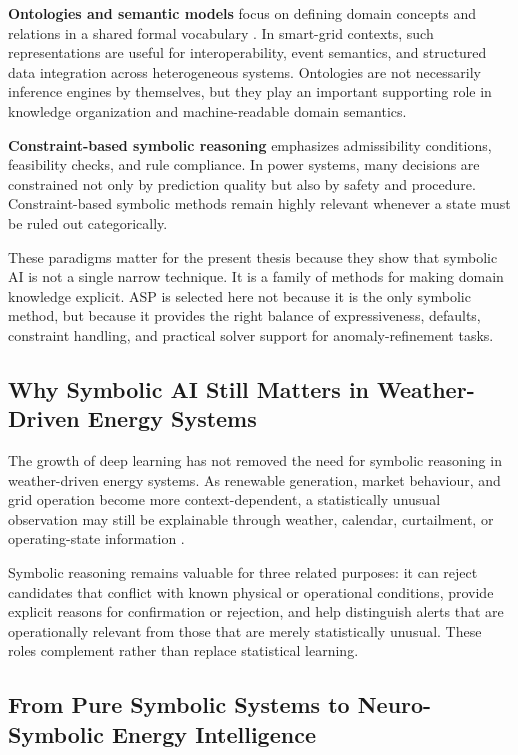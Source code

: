 \textbf{Ontologies and semantic models} focus on defining domain concepts and relations in a shared formal vocabulary \cite{gruber1993ontology,sowa2000knowledge}. In smart-grid contexts, such representations are useful for interoperability, event semantics, and structured data integration across heterogeneous systems. Ontologies are not necessarily inference engines by themselves, but they play an important supporting role in knowledge organization and machine-readable domain semantics.

\textbf{Constraint-based symbolic reasoning} emphasizes admissibility conditions, feasibility checks, and rule compliance. In power systems, many decisions are constrained not only by prediction quality but also by safety and procedure. Constraint-based symbolic methods remain highly relevant whenever a state must be ruled out categorically.

These paradigms matter for the present thesis because they show that symbolic AI is not a single narrow technique. It is a family of methods for making domain knowledge explicit. ASP is selected here not because it is the only symbolic method, but because it provides the right balance of expressiveness, defaults, constraint handling, and practical solver support for anomaly-refinement tasks.

\subsection{Why Symbolic AI Still Matters in Weather-Driven Energy Systems}

The growth of deep learning has not removed the need for symbolic reasoning in
weather-driven energy systems. As renewable generation, market behaviour, and
grid operation become more context-dependent, a statistically unusual observation
may still be explainable through weather, calendar, curtailment, or operating-state
information \cite{amin2005toward,fang2012smartgrid,momoh2012smart}.

Symbolic reasoning remains valuable for three related purposes: it can reject
candidates that conflict with known physical or operational conditions, provide
explicit reasons for confirmation or rejection, and help distinguish alerts that
are operationally relevant from those that are merely statistically unusual. These
roles complement rather than replace statistical learning.

\subsection{From Pure Symbolic Systems to Neuro-Symbolic Energy Intelligence}


